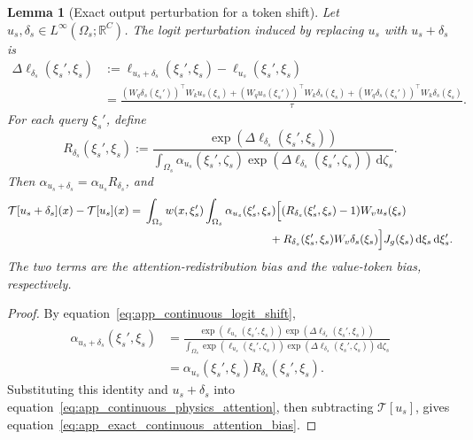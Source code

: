 \documentclass{article}
\def\eqref#1{equation~\ref{#1}}
\newtheorem{lemma}[proposition]{Lemma}
\begin{document}
\begin{lemma}[Exact output perturbation for a token shift]
\label{lem:app_exact_continuous_attention_bias}
Let $u_s,\delta_s\in L^{\infty}(\Omega_s;\mathbb{R}^{C})$. The logit perturbation induced by replacing $u_s$ with $u_s+\delta_s$ is
\begin{align}
    \Delta\ell_{\delta_s}(\xi_s',\xi_s)
    &:=\ell_{u_s+\delta_s}(\xi_s',\xi_s)-\ell_{u_s}(\xi_s',\xi_s)
    \nonumber\\
    &=\frac{(W_q\delta_s(\xi_s'))^{\top}W_ku_s(\xi_s)
    +(W_qu_s(\xi_s'))^{\top}W_k\delta_s(\xi_s)
    +(W_q\delta_s(\xi_s'))^{\top}W_k\delta_s(\xi_s)}{\tau}.
    \label{eq:app_continuous_logit_shift}
\end{align}
For each query $\xi_s'$, define
\begin{equation}
    R_{\delta_s}(\xi_s',\xi_s)
    :=\frac{\exp(\Delta\ell_{\delta_s}(\xi_s',\xi_s))}{\int_{\Omega_s}\alpha_{u_s}(\xi_s',\zeta_s)
    \exp(\Delta\ell_{\delta_s}(\xi_s',\zeta_s))\,\mathrm{d}\zeta_s}.
    \label{eq:app_continuous_attention_ratio}
\end{equation}
Then $\alpha_{u_s+\delta_s}=\alpha_{u_s}R_{\delta_s}$, and
\begin{align}
    \mathcal{T}[u_s+\delta_s](x)-\mathcal{T}[u_s](x)
    ={}&\int_{\Omega_s}w(x,\xi_s')
    \int_{\Omega_s}\alpha_{u_s}(\xi_s',\xi_s)
    \Big[(R_{\delta_s}(\xi_s',\xi_s)-1)W_vu_s(\xi_s)
    \nonumber\\
    &\hspace{39mm}
    +R_{\delta_s}(\xi_s',\xi_s)W_v\delta_s(\xi_s)\Big]
    J_g(\xi_s)\,\mathrm{d}\xi_s\,\mathrm{d}\xi_s'.
    \label{eq:app_exact_continuous_attention_bias}
\end{align}
The two terms are the attention-redistribution bias and the value-token bias, respectively.
\end{lemma}

\begin{proof}
By \eqref{eq:app_continuous_logit_shift},
\begin{align}
    \alpha_{u_s+\delta_s}(\xi_s',\xi_s)
    &=\frac{\exp(\ell_{u_s}(\xi_s',\xi_s))
    \exp(\Delta\ell_{\delta_s}(\xi_s',\xi_s))}{\int_{\Omega_s}\exp(\ell_{u_s}(\xi_s',\zeta_s))
    \exp(\Delta\ell_{\delta_s}(\xi_s',\zeta_s))\,\mathrm{d}\zeta_s}
    \nonumber\\
    &=\alpha_{u_s}(\xi_s',\xi_s)R_{\delta_s}(\xi_s',\xi_s).
    \label{eq:app_continuous_shifted_kernel}
\end{align}
Substituting this identity and $u_s+\delta_s$ into \eqref{eq:app_continuous_physics_attention}, then subtracting $\mathcal{T}[u_s]$, gives \eqref{eq:app_exact_continuous_attention_bias}.
\end{proof}
\end{document}
